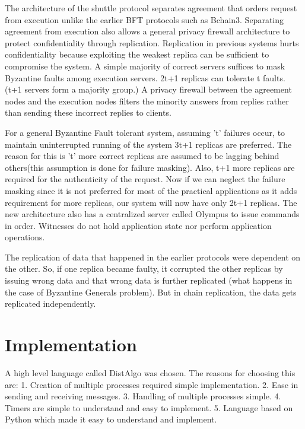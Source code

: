 \documentclass[letterpaper, 10 pt, conference]{ieeeconf}  %
\begin{document}
The architecture of the shuttle protocol separates agreement that orders request from execution unlike the earlier BFT protocols such as Bchain3. Separating agreement from execution also allows a general privacy firewall architecture to protect confidentiality through replication. Replication in previous systems hurts confidentiality because exploiting the weakest
replica can be sufficient to compromise the system. A simple majority of correct servers suffices to mask Byzantine faults among execution servers. 2t+1 replicas can tolerate t faults. (t+1 servers form a majority group.) A privacy firewall between the agreement nodes and the execution nodes filters the  minority answers from replies rather than sending these incorrect replies to clients.\smallskip

For a general Byzantine Fault tolerant system, assuming 't' failures occur, to maintain uninterrupted running of the system 3t+1 replicas are preferred. The reason for this is 't' more correct replicas are assumed to be lagging behind others(this assumption is done for failure masking). Also, t+1 more replicas are required for the authenticity of the request. Now if we can neglect the failure masking since it is not preferred for most of the practical applications as it adds requirement for more replicas, our system will now have only 2t+1 replicas. The new architecture also has a centralized server called Olympus to issue commands in order. Witnesses do not hold application state nor perform application operations.

The replication of data that happened in the earlier protocols were dependent on the other. So, if one replica became faulty, it corrupted the other replicas by issuing wrong data and that wrong data is further replicated (what happens in the case of Byzantine Generals problem). But in chain replication, the data gets replicated independently.

\section{Implementation}

A high level language called DistAlgo was chosen. The reasons for choosing this are:
1. Creation of multiple processes required simple implementation.
2. Ease in sending and receiving messages.
3. Handling of multiple processes simple.
4. Timers are simple to understand and easy to implement.
5. Language based on Python which made it easy to understand and implement.
\end{document}
